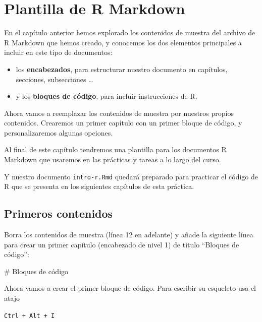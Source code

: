 \documentclass[
  title=normal,
  notoc,
  bib=normal]{mnye}
\newenvironment{Shaded}{\begin{snugshade}}{\end{snugshade}}
\newcommand{\FunctionTok}[1]{\textcolor[rgb]{0.00,0.00,0.00}{#1}}
\begin{document}
\hypertarget{plantilla-de-r-markdown}{%
\section{Plantilla de R Markdown}\label{plantilla-de-r-markdown}}

En el capítulo anterior hemos explorado los contenidos de muestra del archivo de R Markdown que hemos creado, y conocemos los dos elementos principales a incluir en este tipo de documentos:

\begin{itemize}
\item
  los \textbf{encabezados}, para estructurar nuestro documento en capítulos, secciones, subsecciones \ldots{}
\item
  y los \textbf{bloques de código}, para incluir instrucciones de \textsf{R}.
\end{itemize}

Ahora vamos a reemplazar los contenidos de muestra por nuestros propios contenidos. Crearemos un primer capítulo con un primer bloque de código, y personalizaremos algunas opciones.

Al final de este capítulo tendremos una plantilla para los documentos R Markdown que usaremos en las prácticas y tareas a lo largo del curso.

Y nuestro documento \texttt{intro-r.Rmd} quedará preparado para practicar el código de \textsf{R} que se presenta en los siguientes capítulos de esta práctica.

\hypertarget{primeros-contenidos}{%
\subsection{Primeros contenidos}\label{primeros-contenidos}}

Borra los contenidos de muestra (línea 12 en adelante) y añade la siguiente línea para crear un primer capítulo (encabezado de nivel 1) de título ``Bloques de código'':

\begin{Shaded}
\begin{Highlighting}[]
\FunctionTok{\# Bloques de código}
\end{Highlighting}
\end{Shaded}

Ahora vamos a crear el primer bloque de código. Para escribir su esqueleto usa el atajo

\begin{center}
\texttt{Ctrl\ +\ Alt\ +\ I}

\end{center}
\end{document}
